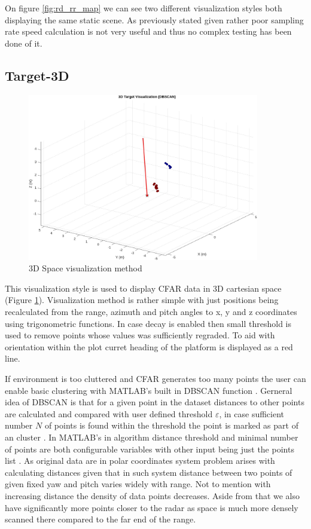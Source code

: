 On figure \ref{fig:rd_rr_map} we can see two different visualization styles both displaying the same static scene.
As previously stated given rather poor sampling rate speed calculation is not very useful and thus no complex testing has been done of it.

\newpage
\subsection{Target-3D}

\begin{figure}[h!]
	\centering
	\includegraphics[width=0.9\textwidth]{../img/vis_3d.jpg}
	\caption[3D Space visualization method]{3D Space visualization method}
	\label{fig:vis3d}
\end{figure}

This visualization style is used to display CFAR data in 3D cartesian space (Figure \ref{fig:vis3d}).
Visualization method is rather simple with just positions being recalculated from the range, azimuth and pitch angles to x, y and z coordinates using trigonometric functions.
In case decay is enabled then small threshold is used to remove points whose values was sufficiently regraded.
To aid with orientation within the plot curret heading of the platform is displayed as a red line.

If environment is too cluttered and CFAR generates too many points the user can enable basic clustering with MATLAB's built in DBSCAN function \cite{matlab_dbscan}.
Gerneral idea of DBSCAN is that for a given point in the dataset distances to other points are calculated and compared with user defined threshold $\varepsilon$, in case sufficient number $N$ of points is found within the threshold the point is marked as part of an cluster \cite{Kellner2012}.
In MATLAB's in algorithm distance threshold and minimal number of points are both configurable variables with other input being just the points list \cite{matlab_dbscan}.
As original data are in polar coordinates system problem arises with calculating distances given that in such system distance between two points of given fixed yaw and pitch varies widely with range.
Not to mention with increasing distance the density of data points decreases.
Aside from that we also have significantly more points closer to the radar as space is much more densely scanned there compared to the far end of the range.

